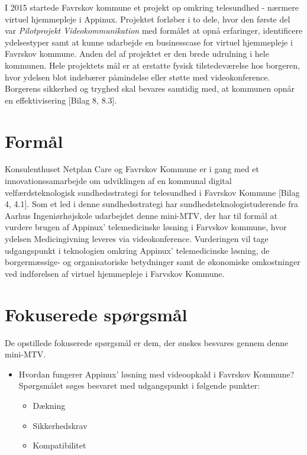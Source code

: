 I 2015 startede Favrskov kommune et projekt op omkring telesundhed - nærmere virtuel hjemmepleje i Appinux. Projektet forløber i to dele, hvor den første del var \textit{Pilotprojekt Videokommunikation} med formålet at opnå erfaringer, identificere ydelsestyper samt at kunne udarbejde en businesscase for virtuel hjemmepleje i Favrskov kommune. Anden del af projektet er den brede udrulning i hele kommunen. Hele projektets mål er at erstatte fysisk tilstedeværelse hos borgeren, hvor ydelsen blot indebærer påmindelse eller støtte med videokonference. Borgerens sikkerhed og tryghed skal bevares samtidig med, at kommunen opnår en effektivisering [Bilag 8, 8.3]. 

\section{Formål}
Konsulenthuset Netplan Care og Favrskov Kommune er i gang med et innovationssamarbejde om udviklingen af en kommunal digital velfærdsteknologisk sundhedsstrategi for telesundhed i Favrskov Kommune [Bilag 4, 4.1]. Som et led i denne sundhedsstrategi har sundhedsteknologistuderende fra Aarhus Ingeniørhøjskole udarbejdet denne mini-MTV, der har til formål at vurdere brugen af Appinux' telemedicinske løsning i Farvskov kommune, hvor ydelsen Medicingivning 
 leveres via videokonference. Vurderingen vil tage udgangspunkt i teknologien omkring Appinux' telemedicinske løsning, de borgermæssige- og organisatoriske betydninger samt de økonomiske omkostninger ved indførelsen af virtuel hjemmepleje i Farvskov Kommune.  

\section{Fokuserede spørgsmål}
De opstillede fokuserede spørgsmål er dem, der ønskes besvares gennem denne mini-MTV. 

\begin{itemize}
	\item Hvordan fungerer Appinux' løsning med videoopkald i Favrskov Kommune? \\Spørgsmålet søges besvaret med udgangspunkt i følgende punkter:
	\begin{itemize}
	\item Dækning
	\item Sikkerhedskrav
	\item Kompatibilitet 
\end{itemize}
\end{itemize}

